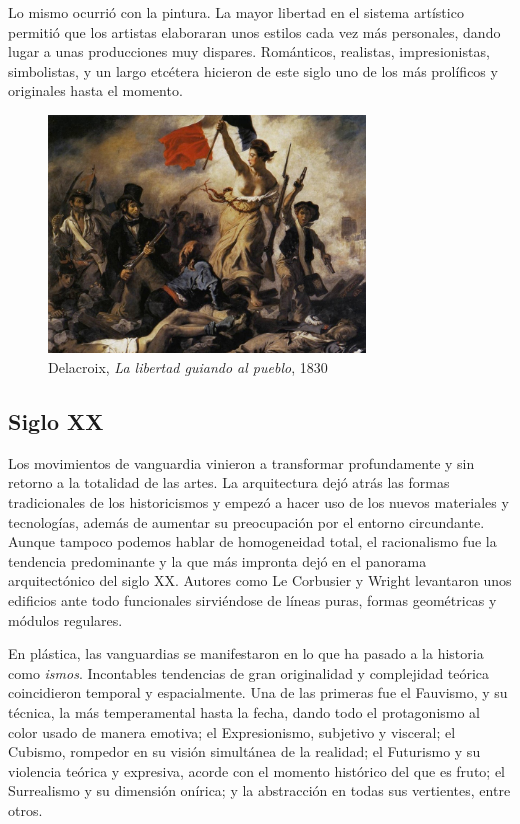 Lo mismo ocurrió con la pintura. La mayor libertad en el sistema artístico permitió que los artistas elaboraran unos estilos cada vez más personales, dando lugar a unas producciones muy dispares. Románticos, realistas, impresionistas, simbolistas, y un largo etcétera hicieron de este siglo uno de los más prolíficos y originales hasta el momento.

\begin{figure}[!h]
    \begin{center}
        \includegraphics[width=0.75\textwidth]{imagenes/2/libertad-guiando.jpg}
        \caption{Delacroix, \textit{La libertad guiando al pueblo}, 1830}
        \label{fig:capilla-sixtina}
    \end{center}
\end{figure}

\subsection{Siglo XX}

Los movimientos de vanguardia vinieron a transformar profundamente y sin retorno a la totalidad de las artes. La arquitectura dejó atrás las formas tradicionales de los historicismos y empezó a hacer uso de los nuevos materiales y tecnologías, además de aumentar su preocupación por el entorno circundante. Aunque tampoco podemos hablar de homogeneidad total, el racionalismo fue la tendencia predominante y la que más impronta dejó en el panorama arquitectónico del siglo XX. Autores como Le Corbusier y Wright levantaron unos edificios ante todo funcionales sirviéndose de líneas puras, formas geométricas y módulos regulares.

En plástica, las vanguardias se manifestaron en lo que ha pasado a la historia como \textit{ismos}. Incontables tendencias de gran originalidad y complejidad teórica coincidieron temporal y espacialmente. Una de las primeras fue el Fauvismo, y su técnica, la más temperamental hasta la fecha, dando todo el protagonismo al color usado de manera emotiva; el Expresionismo, subjetivo y visceral; el Cubismo, rompedor en su visión simultánea de la realidad; el Futurismo y su violencia teórica y expresiva, acorde con el momento histórico del que es fruto; el Surrealismo y su dimensión onírica; y la abstracción en todas sus vertientes, entre otros.

